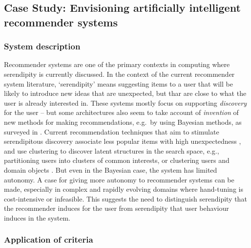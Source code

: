 \subsection{Case Study: Envisioning artificially intelligent recommender systems} \label{sec:nextgenrec}

\subsubsection{System description}

Recommender systems are one of the primary contexts in computing where
serendipity is currently discussed.  In the context of the current
recommender system literature, `serendipity' means suggesting items to
a user that will be likely to introduce new ideas that are unexpected,
but thar are close to what the user is already interested in.  These
systems mostly focus on supporting \emph{discovery} for the user --
but some architectures also seem to take account of \emph{invention}
of new methods for making recommendations, e.g.~by using Bayesian
methods, as surveyed in .  Current
recommendation techniques that aim to stimulate serendipitous
discovery associate less popular items with high unexpectedness
\cite{Herlocker2004,Lu2012}, and use clustering to discover latent
structures in the search space, e.g., partitioning users into clusters
of common interests, or clustering users and domain objects
\cite{Kamahara2005,Onuma2009,Zhang2011}.  But even in the Bayesian
case, the system has limited autonomy.  A case for giving more
autonomy to recommender systems can be made, especially in complex and
rapidly evolving domains where hand-tuning is cost-intensive or
infeasible.  This suggests the need to distinguish serendipity that
the recommender induces for the user from serendipity that user
behaviour induces in the system.

\subsubsection{Application of criteria}

